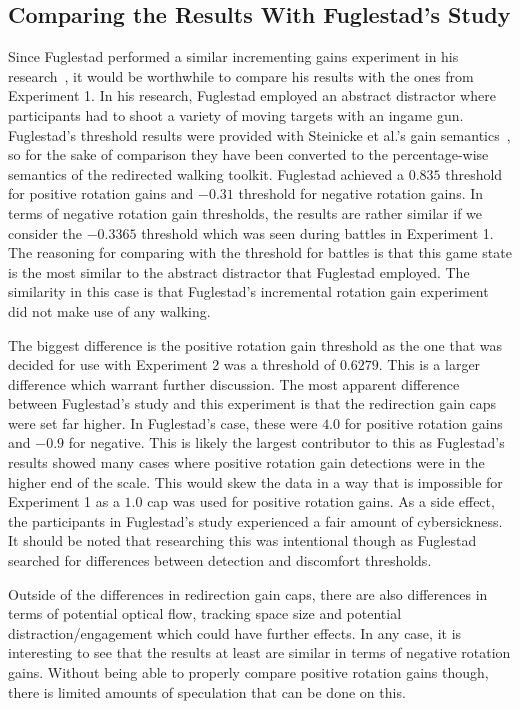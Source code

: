 \subsection{Comparing the Results With Fuglestad's Study}
Since Fuglestad performed a similar incrementing gains experiment in his research~\cite{fuglestad2018redirected}, it would be worthwhile to compare his results with the ones from Experiment 1. In his research, Fuglestad employed an abstract distractor where participants had to shoot a variety of moving targets with an ingame gun. Fuglestad's threshold results were provided with Steinicke et al.'s gain semantics~\cite{5072212}, so for the sake of comparison they have been converted to the percentage-wise semantics of the redirected walking toolkit. Fuglestad achieved a $0.835$ threshold for positive rotation gains and $-0.31$ threshold for negative rotation gains. In terms of negative rotation gain thresholds, the results are rather similar if we consider the $-0.3365$ threshold which was seen during battles in Experiment 1. The reasoning for comparing with the threshold for battles is that this game state is the most similar to the abstract distractor that Fuglestad employed. The similarity in this case is that Fuglestad's incremental rotation gain experiment did not make use of any walking. 

The biggest difference is the positive rotation gain threshold as the one that was decided for use with Experiment 2 was a threshold of $0.6279$. This is a larger difference which warrant further discussion. The most apparent difference between Fuglestad's study and this experiment is that the redirection gain caps were set far higher. In Fuglestad's case, these were $4.0$ for positive rotation gains and $-0.9$ for negative. This is likely the largest contributor to this as Fuglestad's results showed many cases where positive rotation gain detections were in the higher end of the scale. This would skew the data in a way that is impossible for Experiment 1 as a $1.0$ cap was used for positive rotation gains. As a side effect, the participants in Fuglestad's study experienced a fair amount of cybersickness. It should be noted that researching this was intentional though as Fuglestad searched for differences between detection and discomfort thresholds.

Outside of the differences in redirection gain caps, there are also differences in terms of potential optical flow, tracking space size and potential distraction/engagement which could have further effects. In any case, it is interesting to see that the results at least are similar in terms of negative rotation gains. Without being able to properly compare positive rotation gains though, there is limited amounts of speculation that can be done on this. 

